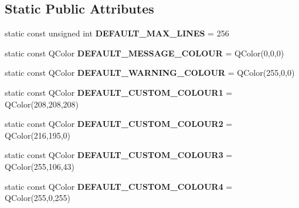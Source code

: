 \subsection*{Static Public Attributes}
\begin{DoxyCompactItemize}
\item 
\hypertarget{class_console_widget_af215d1c2ed6a4b8891528dd0cdbc4585}{static const unsigned int {\bfseries D\-E\-F\-A\-U\-L\-T\-\_\-\-M\-A\-X\-\_\-\-L\-I\-N\-E\-S} = 256}\label{class_console_widget_af215d1c2ed6a4b8891528dd0cdbc4585}

\item 
\hypertarget{class_console_widget_a1b1a4275424776cca6958cc5afd3c2d1}{static const Q\-Color {\bfseries D\-E\-F\-A\-U\-L\-T\-\_\-\-M\-E\-S\-S\-A\-G\-E\-\_\-\-C\-O\-L\-O\-U\-R} = Q\-Color(0,0,0)}\label{class_console_widget_a1b1a4275424776cca6958cc5afd3c2d1}

\item 
\hypertarget{class_console_widget_ab73a773298b4822640c9a64c9f75b8a8}{static const Q\-Color {\bfseries D\-E\-F\-A\-U\-L\-T\-\_\-\-W\-A\-R\-N\-I\-N\-G\-\_\-\-C\-O\-L\-O\-U\-R} = Q\-Color(255,0,0)}\label{class_console_widget_ab73a773298b4822640c9a64c9f75b8a8}

\item 
\hypertarget{class_console_widget_abbd61319fc0c7feeb51623498eddeb9a}{static const Q\-Color {\bfseries D\-E\-F\-A\-U\-L\-T\-\_\-\-C\-U\-S\-T\-O\-M\-\_\-\-C\-O\-L\-O\-U\-R1} = Q\-Color(208,208,208)}\label{class_console_widget_abbd61319fc0c7feeb51623498eddeb9a}

\item 
\hypertarget{class_console_widget_a07ff3055aa08dd9d86531db2838e086a}{static const Q\-Color {\bfseries D\-E\-F\-A\-U\-L\-T\-\_\-\-C\-U\-S\-T\-O\-M\-\_\-\-C\-O\-L\-O\-U\-R2} = Q\-Color(216,195,0)}\label{class_console_widget_a07ff3055aa08dd9d86531db2838e086a}

\item 
\hypertarget{class_console_widget_a5c08a0f2b6fa95efdc7c86b79d70c126}{static const Q\-Color {\bfseries D\-E\-F\-A\-U\-L\-T\-\_\-\-C\-U\-S\-T\-O\-M\-\_\-\-C\-O\-L\-O\-U\-R3} = Q\-Color(255,106,43)}\label{class_console_widget_a5c08a0f2b6fa95efdc7c86b79d70c126}

\item 
\hypertarget{class_console_widget_a82acbc07440b3d74150fe7d72279ae2b}{static const Q\-Color {\bfseries D\-E\-F\-A\-U\-L\-T\-\_\-\-C\-U\-S\-T\-O\-M\-\_\-\-C\-O\-L\-O\-U\-R4} = Q\-Color(255,0,255)}\label{class_console_widget_a82acbc07440b3d74150fe7d72279ae2b}


\end{DoxyCompactItemize}
